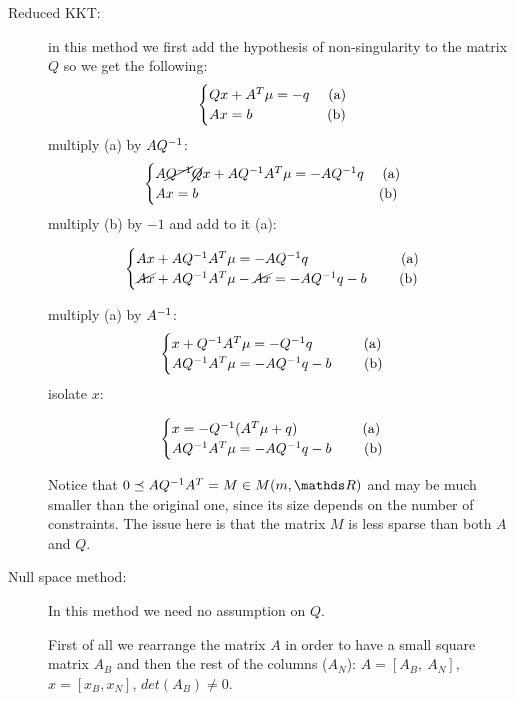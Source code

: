 \documentclass[ComputationalMathematics.tex]{subfiles}
\begin{document}
\begin{description}
  \item[{\sc Reduced KKT:}] in this method we first add the hypothesis of non-singularity to the matrix $Q$ so we get the following:
    \[
      \begin{cases}
        Qx + {A}^{T} \mu = -q \text{~~~~(a)}\\
        Ax = b \text{~~~~~~~~~~~~~~~~(b)}
      \end{cases}
    \]
    multiply (a) by $A{Q}^{-1}$:
    \[
      \begin{cases}
        A \cancel{{Q}^{-1}}\cancel{Q}x + A {Q}^{-1} {A}^{T} \mu = -A {Q}^{-1} q \text{~~~~(a)}\\
        Ax = b \text{~~~~~~~~~~~~~~~~~~~~~~~~~~~~~~~~~~~~~~~(b)}
      \end{cases}
    \]
    multiply (b) by $-1$ and add to it (a):

    \[
      \begin{cases}
        Ax + A{Q}^{-1}{A}^{T} \mu = -A{Q}^{-1}q \text{~~~~~~~~~~~~~~~~~~~~(a)}\\
        \cancel{Ax} + A{Q}^{-1}{A}^{T}\mu - \cancel{Ax} = -A{Q}^{-1}q -b \text{~~~~~~~(b)}
      \end{cases}
    \]

    multiply (a) by ${A}^{-1}$:
    \[
      \begin{cases}
        x + {Q}^{-1}{A}^{T} \mu = -{Q}^{-1}q \text{~~~~~~~~~~~(a)}\\
        A{Q}^{-1}{A}^{T}\mu = -A{Q}^{-1}q -b \text{~~~~~~~(b)}
      \end{cases}
    \]
    isolate $x$:

    \[
      \begin{cases}
        x = -{Q}^{-1}({A}^{T} \mu + q) \text{~~~~~~~~~~~~~~(a)}\\
        A{Q}^{-1}{A}^{T}\mu = -A{Q}^{-1}q -b \text{~~~~~~~(b)}
      \end{cases}
    \]

    Notice that $0 \preceq A\inv{Q}\tr{A} = M \in M(m,\R)$ and may be much smaller than the original one, since its size depends on the number of constraints. The issue here is that the matrix $M$ is less sparse than both $A$ and $Q$.

  \item[{\sc Null space method:}] In this method we need no assumption on $Q$.

    First of all we rearrange the matrix $A$ in order to have a small square matrix $A_B$ and then the rest  of the columns ($A_N$): $A = [A_B,~A_N]$, $x = [x_B, x_N]$, $det(A_B) \neq 0$.
    

\end{description}
\end{document}
